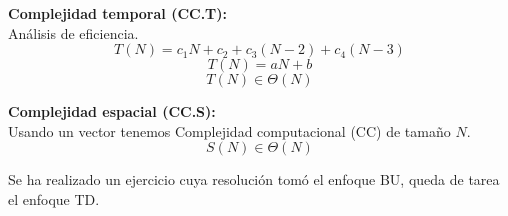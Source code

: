 \documentclass[tikz,11pt,fleqn]{book} %
\begin{document}
\begin{example}
\begin{enumerate}
		      \textbf{Complejidad temporal (CC.T):\\}
		      Análisis de eficiencia.
		      $$ T(N)=c_1N+c_2+c_3(N-2)+c_4(N-3) $$
		      $$ T(N)=aN+b $$
		      $$ T(N)\in \Theta(N) $$

		      \textbf{Complejidad espacial (CC.S):\\}
		      Usando un vector tenemos Complejidad computacional (CC) de tamaño $N$.
		      $$ S(N)\in\Theta(N) $$
	\end{enumerate}
\end{example}

Se ha realizado un ejercicio cuya resolución tomó el enfoque BU, queda de tarea el enfoque TD.

\end{document}

